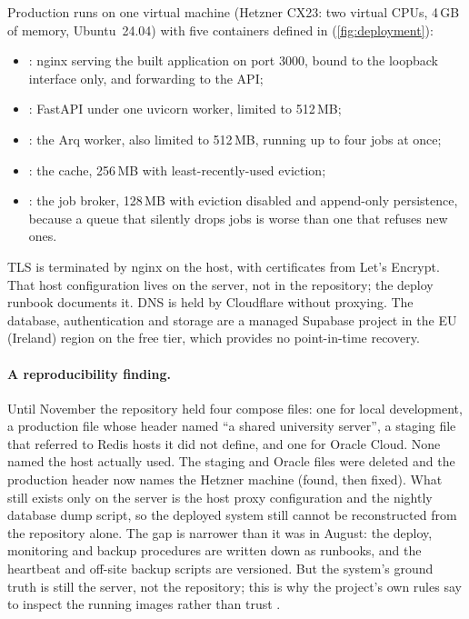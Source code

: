 Production runs on one virtual machine (Hetzner CX23: two virtual CPUs, 4\,GB of
memory, Ubuntu~24.04) with five containers defined in
 (\cref{fig:deployment}):
\begin{itemize}
  \item {}: nginx serving the built application on port 3000, bound
    to the loopback interface only, and forwarding  to the API;
  \item {}: FastAPI under one uvicorn worker, limited to 512\,MB;
  \item {}: the Arq worker, also limited to 512\,MB, running up to four
    jobs at once;
  \item {}: the cache, 256\,MB with least-recently-used eviction;
  \item {}: the job broker, 128\,MB with eviction disabled and
    append-only persistence, because a queue that silently drops jobs is worse
    than one that refuses new ones.
\end{itemize}
TLS is terminated by nginx on the host, with certificates from Let's Encrypt.
That host configuration lives on the server, not in the repository; the deploy
runbook documents it. DNS is held by Cloudflare without proxying. The database,
authentication and storage are a managed Supabase project in the EU (Ireland)
region on the free tier, which provides no point-in-time recovery.

\paragraph{A reproducibility finding.}
Until November the repository held four compose files: one for local
development, a production file whose header named ``a shared university
server'', a staging file that referred to Redis hosts it did not define, and one
for Oracle Cloud. None named the host actually used. The staging and Oracle files
were deleted and the production header now names the Hetzner machine (found,
then fixed). What still exists only on the server is the host proxy
configuration and the nightly database dump script, so the deployed system
still cannot be reconstructed from the repository alone. The gap is narrower
than it was in August: the deploy, monitoring and backup procedures are written
down as runbooks, and the heartbeat and off-site backup scripts are versioned.
But the
system's ground truth is still the server, not the repository; this is why the
project's own rules say to inspect the running images rather than trust
.

